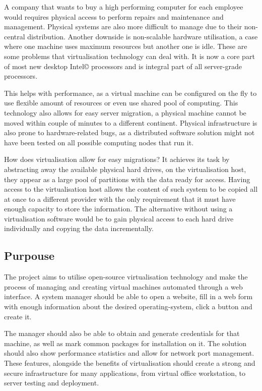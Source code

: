 \documentclass{article}
\begin{document}
  A company that wants to buy a high performing computer for each employee would requires physical access to perform repairs and maintenance and management. Physical systems are also more difficult to manage due to their non-central distribution. Another downside is non-scalable hardware utilisation, a case where one machine uses maximum resources but another one is idle. These are some problems that virtualisation technology can deal with.  It is now a core part of most new desktop Intel© processors and is integral part of all server-grade processors.
  
  This helps with performance, as a virtual machine can be configured on the fly to use flexible amount of resources or even use shared pool of computing. This technology also allows for easy server migration, a physical machine cannot be moved within couple of minutes to a different continent. Physical infrastructure is also prone to hardware-related bugs, as a distributed software solution might not have been tested on all possible computing nodes that run it.
  
  How does virtualisation allow for easy migrations? It achieves its task by abstracting away the available physical hard drives, on the virtualisation host, they appear as a large pool of partitions with the data ready for access. Having access to the virtualisation host allows the content of such system to be copied all at once to a different provider with the only requirement that it must have enough capacity to store the information. The alternative without using a virtualisation software would be to gain physical access to each hard drive individually and copying the data incrementally.
  
  \subsection{Purpouse}
   The project aims to utilise open-source virtualisation technology and make the process of managing and creating virtual machines automated through a web interface. A system manager should be able to open a website, fill in a web form with enough information about the desired \gls{operating-system}, click a button and create it. 
   
   The manager should also be able to obtain and generate credentials for that machine, as well as mark common packages for installation on it. The solution should also show performance statistics and allow for network port management. These features, alongside the benefits of virtualisation should create a strong and secure infrastructure for many applications, from virtual office workstation, to server testing and deployment.
   
\end{document}
